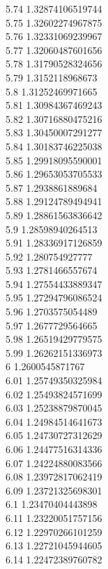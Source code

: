 {5.74	1.32874106519744\\
5.75	1.32602274967875\\
5.76	1.32331069239967\\
5.77	1.32060487601656\\
5.78	1.31790528324656\\
5.79	1.3152118968673\\
5.8	1.31252469971665\\
5.81	1.30984367469243\\
5.82	1.30716880475216\\
5.83	1.30450007291277\\
5.84	1.30183746225038\\
5.85	1.29918095590001\\
5.86	1.29653053705533\\
5.87	1.2938861889684\\
5.88	1.29124789494941\\
5.89	1.28861563836642\\
5.9	1.28598940264513\\
5.91	1.28336917126859\\
5.92	1.280754927777\\
5.93	1.2781466557674\\
5.94	1.27554433889347\\
5.95	1.27294796086524\\
5.96	1.2703575054489\\
5.97	1.2677729564665\\
5.98	1.26519429779575\\
5.99	1.26262151336973\\
6	1.2600545871767\\
6.01	1.25749350325984\\
6.02	1.25493824571699\\
6.03	1.25238879870045\\
6.04	1.24984514641673\\
6.05	1.24730727312629\\
6.06	1.24477516314336\\
6.07	1.24224880083566\\
6.08	1.23972817062419\\
6.09	1.23721325698301\\
6.1	1.23470404443898\\
6.11	1.23220051757156\\
6.12	1.22970266101259\\
6.13	1.22721045944605\\
6.14	1.22472389760782\\
}
